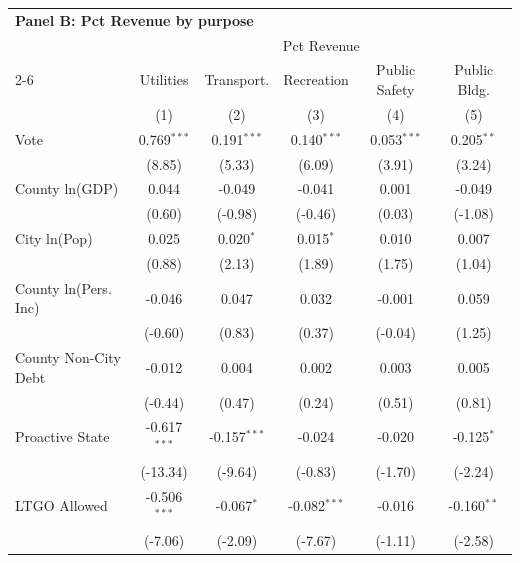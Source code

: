 \begingroup
\centering
\begin{tabular*}{\textwidth}{@{\extracolsep{\fill}}lccccc}
\multicolumn{5}{l}{\textbf{Panel B: Pct Revenue by purpose}}\\

\addlinespace
   \toprule
    & \multicolumn{5}{c}{Pct Revenue}\\
   \cmidrule(lr){2-6}
                        & Utilities      & Transport.     & Recreation     & Public Safety & Public Bldg. \\   
                        & (1)            & (2)            & (3)            & (4)           & (5)\\  
   \midrule 
   Vote                 & 0.769$^{***}$  & 0.191$^{***}$  & 0.140$^{***}$  & 0.053$^{***}$ & 0.205$^{**}$\\   
                        & (8.85)        & (5.33)        & (6.09)        & (3.91)       & (3.24)\\   
   County ln(GDP)       & 0.044          & -0.049         & -0.041         & 0.001         & -0.049\\   
                        & (0.60)        & (-0.98)       & (-0.46)       & (0.03)       & (-1.08)\\   
   City ln(Pop)         & 0.025          & 0.020$^{*}$    & 0.015$^{*}$    & 0.010         & 0.007\\   
                        & (0.88)        & (2.13)        & (1.89)        & (1.75)       & (1.04)\\   
   County ln(Pers. Inc) & -0.046         & 0.047          & 0.032          & -0.001        & 0.059\\   
                        & (-0.60)       & (0.83)        & (0.37)        & (-0.04)      & (1.25)\\   
   County Non-City Debt & -0.012         & 0.004          & 0.002          & 0.003         & 0.005\\   
                        & (-0.44)       & (0.47)        & (0.24)        & (0.51)       & (0.81)\\   
   Proactive State      & -0.617$^{***}$ & -0.157$^{***}$ & -0.024         & -0.020        & -0.125$^{*}$\\   
                        & (-13.34)      & (-9.64)       & (-0.83)       & (-1.70)      & (-2.24)\\   
   LTGO Allowed         & -0.506$^{***}$ & -0.067$^{*}$   & -0.082$^{***}$ & -0.016        & -0.160$^{**}$\\   
                        & (-7.06)       & (-2.09)       & (-7.67)       & (-1.11)      & (-2.58)\\   

\end{tabular*}

